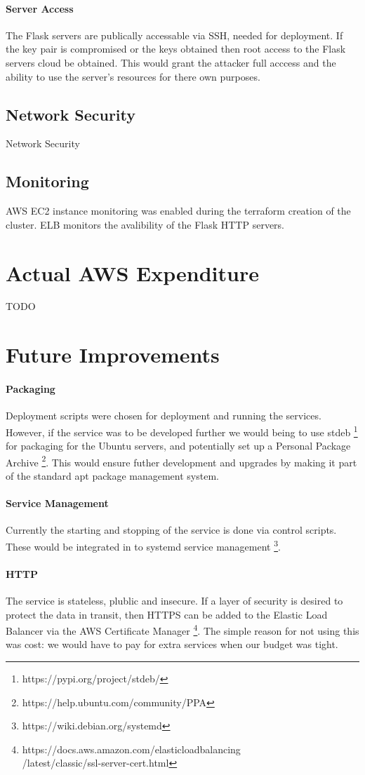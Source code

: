 \documentclass[conference]{IEEEtran}
\begin{document}
\paragraph{Server Access}
The Flask servers are publically accessable via SSH, needed for deployment. If the key pair is compromised or the keys obtained then root access to the Flask servers cloud be obtained. This would grant the attacker full acccess and the ability to use the server's resources for there own purposes.
\subsection{Network Security}
Network Security
\subsection{Monitoring}
AWS EC2 instance monitoring was enabled during the terraform creation of the cluster. ELB monitors the avalibility of the Flask HTTP servers.
\section{Actual AWS Expenditure}
TODO
\section{Future Improvements}
\paragraph{Packaging}
Deployment scripts were chosen for deployment and running the services. However, if the service was to be developed further we would being to use stdeb \footnote{https://pypi.org/project/stdeb/} for packaging for the Ubuntu servers, and potentially set up a Personal Package Archive \footnote{https://help.ubuntu.com/community/PPA}. This would ensure futher development and upgrades by making it part of the standard apt package management system.
\paragraph{Service Management}
Currently the starting and stopping of the service is done via control scripts. These would be integrated in to systemd service management \footnote{https://wiki.debian.org/systemd}.
\paragraph{HTTP}
The service is stateless, plublic and insecure. If a layer of security is desired to protect the data in transit, then HTTPS can be added to the Elastic Load Balancer via the AWS Certificate Manager \footnote{https://docs.aws.amazon.com/elasticloadbalancing\\/latest/classic/ssl-server-cert.html}. The simple reason for not using this was cost: we would have to pay for extra services when our budget was tight.
\end{document}
